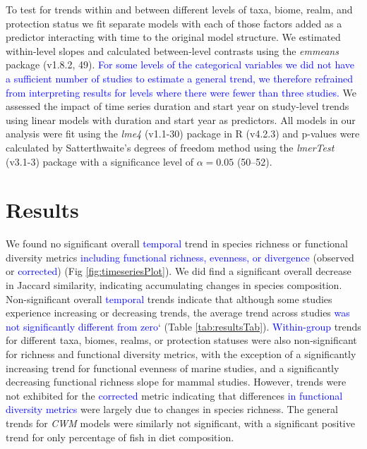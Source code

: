 \documentclass{article}
\begin{document}
To test for trends within and between different levels of taxa, biome,
realm, and protection status we fit separate models with each of those
factors added as a predictor interacting with time to the original model
structure. We estimated within-level slopes and calculated between-level
contrasts using the \emph{emmeans} package (v1.8.2, 49).
\textcolor{blue}{For some levels of the categorical variables we did not have a sufficient number of studies to estimate a general trend, we therefore refrained from interpreting results for levels where there were fewer than three studies.}
We assessed the impact of time series duration and start year on
study-level trends using linear models with duration and start year as
predictors. All models in our analysis were fit using the \emph{lme4}
(v1.1-30) package in R (v4.2.3) and p-values were calculated by
Satterthwaite's degrees of freedom method using the \emph{lmerTest}
(v3.1-3) package with a significance level of \(\alpha = 0.05\)
(50--52).

\hypertarget{results}{%
\section{Results}\label{results}}

We found no significant overall \textcolor{blue}{temporal} trend in
species richness or functional diversity metrics
\textcolor{blue}{including functional richness, evenness, or divergence}
(observed or \textcolor{blue}{corrected}) (Fig
\ref{fig:timeseriesPlot}). We did find a significant overall decrease in
Jaccard similarity, indicating accumulating changes in species
composition. Non-significant overall \textcolor{blue}{temporal} trends
indicate that although some studies experience increasing or decreasing
trends, the average trend across studies
\textcolor{blue}{was not significantly different from zero}` (Table
\ref{tab:resultsTab}). \textcolor{blue}{Within-group} trends for
different taxa, biomes, realms, or protection statuses were also
non-significant for richness and functional diversity metrics, with the
exception of a significantly increasing trend for functional evenness of
marine studies, and a significantly decreasing functional richness slope
for mammal studies. However, trends were not exhibited for the
\textcolor{blue}{corrected} metric indicating that differences
\textcolor{blue}{in functional diversity metrics} were largely due to
changes in species richness. The general trends for \emph{CWM} models
were similarly not significant, with a significant positive trend for
only percentage of fish in diet composition.
\end{document}
